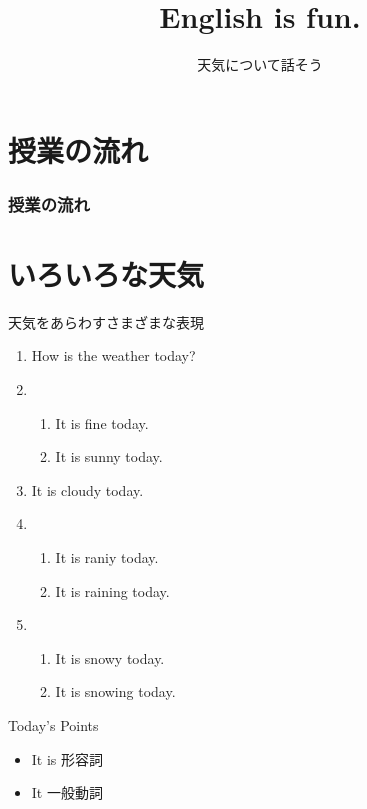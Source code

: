 \documentclass[aspectratio=169,xcolor={dvipsnames,table}]{beamer}
\title{English is fun.}
\subtitle{天気について話そう}
\author{}
\institute[]{}
\date[]
\begin{document}
\begin{frame}[plain]
  \titlepage
\end{frame}

\section*{授業の流れ}
\begin{frame}[plain]
  \frametitle{授業の流れ}
  \tableofcontents
\end{frame}

\section{いろいろな天気}
\begin{frame}[plain]{天気をあらわすさまざまな表現}


\begin{enumerate}
 \item How is the weather today?
 \item \begin{enumerate}
	\item It is fine today.
	\item It is sunny today.
       \end{enumerate}
 \item It is cloudy today.
 \item \begin{enumerate}
	\item It is raniy today.
	\item It is raining today.
       \end{enumerate}
 \item \begin{enumerate}
	\item It is snowy today.
	\item It is snowing today.
       \end{enumerate}
\end{enumerate}

\begin{block}{Today's Points}
\begin{itemize}[square]\small
 \item It is 形容詞
 \item It 一般動詞
\end{itemize}
\end{block}
\end{frame}
\end{document}
